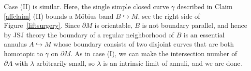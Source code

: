 \documentclass[12pt]{amsart}
\theoremstyle{definition}
\theoremstyle{remark}
\begin{document}
Case (II) is similar. Here, the single simple closed curve $\gamma$ described in Claim \ref{affclaim} (II)  bounds a M\"obius band $B \hookrightarrow M$, see the right side of Figure~\ref{liftsurgery}. Since $\partial M$ is orientable, $B$ is not boundary parallel, and hence by JSJ theory the   boundary of a regular neighborhood of $B$ is an essential annulus $A \hookrightarrow M$ whose boundary consists of two disjoint curves that are both homotopic to $\gamma$ on $\partial M$. As in case (I), we can make the intersection number of $\partial A$ with $\lambda$ arbitrarily small, so $\lambda $ is an intrinsic limit of annuli, and we are done.




\end{document}
